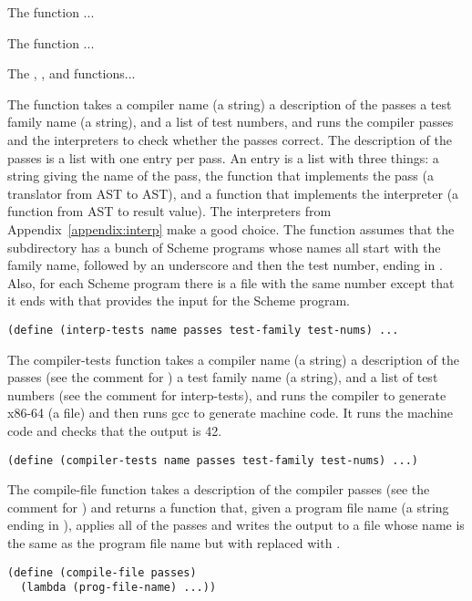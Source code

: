 \documentclass[11pt]{book}
\begin{document}
The  function ...

The  function ...

The , , and 
functions...

The  function takes a compiler name (a string) a
description of the passes a test family name (a string), and a list of
test numbers, and runs the compiler passes and the interpreters to
check whether the passes correct. The description of the passes is a
list with one entry per pass.  An entry is a list with three things: a
string giving the name of the pass, the function that implements the
pass (a translator from AST to AST), and a function that implements
the interpreter (a function from AST to result value).  The
interpreters from Appendix~\ref{appendix:interp} make a good choice.
The  function assumes that the subdirectory
 has a bunch of Scheme programs whose names all start with
the family name, followed by an underscore and then the test number,
ending in . Also, for each Scheme program there is a file
with the same number except that it ends with  that provides
the input for the Scheme program.
\begin{lstlisting}
(define (interp-tests name passes test-family test-nums) ...
\end{lstlisting}

The compiler-tests function takes a compiler name (a string) a
description of the passes (see the comment for ) a
test family name (a string), and a list of test numbers (see the
comment for interp-tests), and runs the compiler to generate x86-64 (a
 file) and then runs gcc to generate machine code.  It runs
the machine code and checks that the output is 42.
\begin{lstlisting}
(define (compiler-tests name passes test-family test-nums) ...)
\end{lstlisting}

The compile-file function takes a description of the compiler passes
(see the comment for ) and returns a function that,
given a program file name (a string ending in ), applies all
of the passes and writes the output to a file whose name is the same
as the program file name but with  replaced with .
\begin{lstlisting}
(define (compile-file passes)
  (lambda (prog-file-name) ...))
\end{lstlisting}



\end{document}
